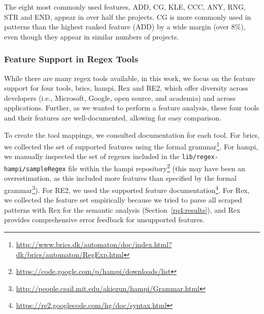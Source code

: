 The eight most commonly used features, ADD, CG, KLE, CCC, ANY, RNG, STR and END,
appear in over half the projects. %
CG is more commonly used in patterns than the highest ranked feature (ADD) by a wide margin (over 8\%), even though they appear in similar numbers of projects.

\subsubsection{Feature Support in Regex Tools}
\label{regextoolsresults}
While there are many regex tools available, in this work, we focus on the feature support for  four tools, brics, hampi, Rex and RE2, which offer diversity across developers (i.e., Microsoft, Google, open source, and academia) and across applications. Further, as we wanted to perform a feature analysis, these four tools and their features are well-documented, allowing for easy comparison.

To create the tool mappings, we consulted documentation for each tool. For brics, we collected the set of supported features using the formal grammar\footnote{\url{http://www.brics.dk/automaton/doc/index.html?dk/brics/automaton/RegExp.html}}.  For hampi, we manually inspected the set of regexes included in the {\tt lib/regex-hampi/sampleRegex} file within the hampi repository\footnote{\url{https://code.google.com/p/hampi/downloads/list}} (this may have been an overestimation, as this included more features than specified by the formal grammar\footnote{\url{http://people.csail.mit.edu/akiezun/hampi/Grammar.html}}).  For RE2, we used the  supported feature documentation\footnote{\url{https://re2.googlecode.com/hg/doc/syntax.html}}.  For Rex, we collected the feature set empirically because we tried to parse all scraped patterns with Rex for the semantic analysis (Section~\ref{rq4:results}), and Rex provides comprehensive error feedback for unsupported features.



